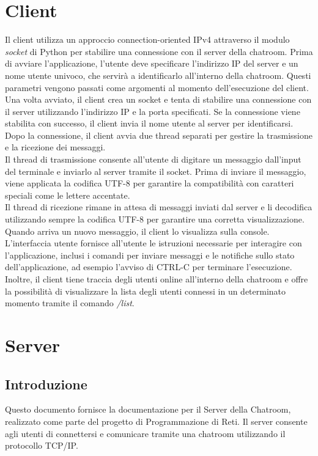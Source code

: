 \documentclass[a4paper,12pt]{report}
\begin{document}
\chapter{Client}
Il client utilizza un approccio connection-oriented IPv4 attraverso il modulo \textit{socket} di Python per stabilire una connessione con il server della chatroom. Prima di avviare l'applicazione, l'utente deve specificare l'indirizzo IP del server e un nome utente univoco, che servirà a identificarlo all'interno della chatroom. Questi parametri vengono passati come argomenti al momento dell'esecuzione del client.
\\
Una volta avviato, il client crea un socket e tenta di stabilire una connessione con il server utilizzando l'indirizzo IP e la porta specificati. Se la connessione viene stabilita con successo, il client invia il nome utente al server per identificarsi.
\\
Dopo la connessione, il client avvia due thread separati per gestire la trasmissione e la ricezione dei messaggi. 
\\
Il thread di trasmissione consente all'utente di digitare un messaggio dall'input del terminale e inviarlo al server tramite il socket. Prima di inviare il messaggio, viene applicata la codifica UTF-8 per garantire la compatibilità con caratteri speciali come le lettere accentate.
\\
Il thread di ricezione rimane in attesa di messaggi inviati dal server e li decodifica utilizzando sempre la codifica UTF-8 per garantire una corretta visualizzazione. Quando arriva un nuovo messaggio, il client lo visualizza sulla console.
\\
L'interfaccia utente fornisce all'utente le istruzioni necessarie per interagire con l'applicazione, inclusi i comandi per inviare messaggi e le notifiche sullo stato dell'applicazione, ad esempio l'avviso di CTRL-C per terminare l'esecuzione.
\\
Inoltre, il client tiene traccia degli utenti online all'interno della chatroom e offre la possibilità di visualizzare la lista degli utenti connessi in un determinato momento tramite il comando \textit{/list}.
\chapter{Server}
\section{Introduzione}
Questo documento fornisce la documentazione per il Server della Chatroom, realizzato come parte del progetto di Programmazione di Reti. Il server consente agli utenti di connettersi e comunicare tramite una chatroom utilizzando il protocollo TCP/IP.
\end{document}

